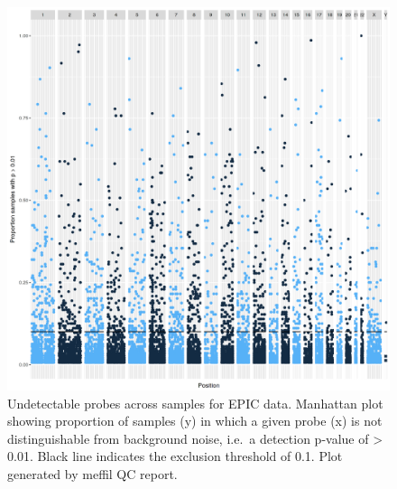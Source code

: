 \documentclass[]{book}
\begin{document}
\begin{figure}

{\centering \includegraphics[width=0.8\linewidth]{figs/MAVIDOSqcEPICpropSamples} 

}

\caption{Undetectable probes across samples for EPIC data. Manhattan plot showing proportion of samples (y) in which a given probe (x) is not distinguishable from background noise, i.e.~a detection p-value of \textgreater{} 0.01. Black line indicates the exclusion threshold of 0.1. Plot generated by meffil QC report.}\label{fig:MAVIDOSqcEPICpropSamples}
\end{figure}
\end{document}
